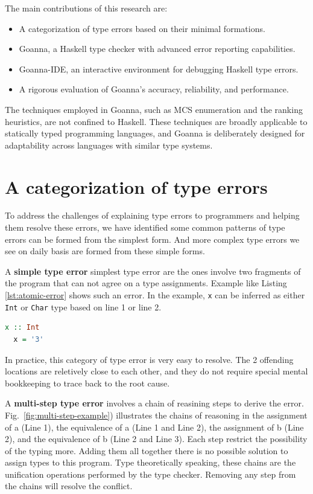 \documentclass[pdflatex,sn-mathphys-num]{sn-jnl}%
\begin{document}
The main contributions of this research are:
\begin{itemize}
    \item A categorization of type errors based on their minimal formations.
    \item Goanna, a Haskell type checker with advanced error reporting capabilities.
    \item Goanna-IDE, an interactive environment for debugging Haskell type errors.
    \item A rigorous evaluation of Goanna's accuracy, reliability, and performance.
\end{itemize}

The techniques employed in Goanna, such as MCS enumeration and the  ranking heuristics, are not confined to Haskell. These techniques are broadly applicable to statically typed programming languages, and Goanna is deliberately designed for adaptability across languages with similar type systems.

\section*{A categorization of type errors} \label{sec:categories-1}

To address the challenges of explaining type errors to programmers and helping them resolve these errors, we have identified some common patterns of type errors can be formed from the simplest form. And more complex type errors we see on daily basis are formed from these simple forms.

A \textbf{simple type error} simplest type error are the ones involve two fragments of the program that can not agree on a type assignments. Example like Listing \ref{lst:atomic-error} shows such an error. In the example, {\tt x} can be inferred as either {\tt Int} or {\tt Char} type based on line 1 or line 2. 

\begin{lstlisting}[language=Haskell, caption=The simplest form of type error, label={lst:atomic-error}]
  x :: Int
  x = '3'
\end{lstlisting}

In practice, this category of type error is very easy to resolve. The 2 offending locations are reletively close to each other, and they do not require special mental bookkeeping to trace back to the root cause. 


A \textbf{multi-step type error} involves a chain of reasining steps to derive the error. Fig.~\ref{fig:multi-step-example}) illustrates the chains of reasoning in the assignment of a (Line 1), the equivalence of a (Line 1 and Line 2), the assignment of b (Line 2), and the equivalence of b (Line 2 and Line 3). Each step restrict the possibility of the typing more. Adding them all together there is no possible solution to assign types to this program. Type theoretically speaking, these chains are the unification operations performed by the type checker. Removing any step from the chains will resolve the conflict.
\end{document}

